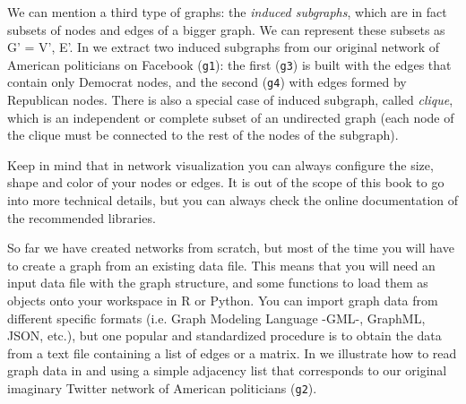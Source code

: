 We can  mention a third type of graphs: the \textit{induced subgraphs}, which are in fact subsets of nodes and edges of a bigger graph. We can represent these subsets as G' = V', E'. In  we extract two induced subgraphs from our original network of American politicians on Facebook (\texttt{g1}): the first (\texttt{g3}) is built with the edges that contain only Democrat nodes, and the second (\texttt{g4}) with edges formed by Republican nodes. There is also a special case of induced subgraph, called \textit{clique}, which is an independent or complete subset of an undirected graph (each node of the clique must be connected to the rest of the nodes of the subgraph).


Keep in mind that in network visualization you can always configure the size, shape and color of your nodes or edges. It is out of the scope of this book to go into more technical details, but you can always check the online documentation of the recommended libraries.

So far we have created networks from scratch, but most of the time you will have to create a graph from an existing data file. This means that you will need an input data file with the graph structure, and some functions to load them as objects onto your workspace in R or Python. You can import graph data from different specific formats (i.e. Graph Modeling Language -GML-, GraphML, JSON, etc.), but one popular and standardized procedure is to obtain the data from a text file containing a list of edges or a matrix. In   we illustrate how to read graph data in  and  using a simple adjacency list that corresponds to our original imaginary Twitter network of American politicians (\texttt{g2}).

